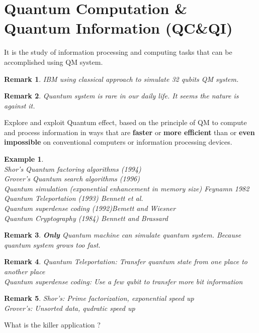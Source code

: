 \documentclass[]{article}
\newtheorem*{remark}{Remark}
\newtheorem*{example}{Example}
\theoremstyle{nonumberplain}
\begin{document}
\section{Quantum Computation \& Quantum Information (QC\&QI)}%
\label{sec:quantum_computation_quantum_information}
It is the study of information processing and computing tasks that can be accomplished using QM system.
\begin{remark}
IBM using classical approach to simulate 32 qubits QM system. 
\end{remark}
\begin{remark}
Quantum system is rare in our daily life. It seems the nature is against it.
\end{remark}
\begin{flushleft}
Explore and exploit Quantum effect, based on the principle of QM to compute and process information in ways that are \textbf{faster} or \textbf{more efficient} than or \textbf{even impossible} on conventional computers or information processing devices.
\end{flushleft}
\begin{example}
\ \\
Shor's Quantum factoring algorithms (1994)\\
Grover's Quantum search algorithms (1996)\\
Quantum simulation (exponential enhancement in memory size) Feynamn 1982\\
Quantum Teleportation (1993) Bennett et al.\\
Quantum superdense coding (1992)Bemett and Wiesner \\
Quantum Cryptography (1984) Bennett and Brassard
\end{example}
\begin{remark}
\textbf{Only} Quantum machine can simulate quantum system. Because quantum system grows too fast.
\end{remark}
\begin{remark}
Quantum Teleportation: Transfer quantum state from one place to another place \\
Quantum superdense coding: Use a few qubit to transfer more bit information
\end{remark}
\begin{remark}
Shor's: Prime factorization, exponential speed up\\
Grover's: Unsorted data, qudratic speed up\\ 
\end{remark}
\begin{center}
What is the killer application ?
\end{center}
\end{document}
